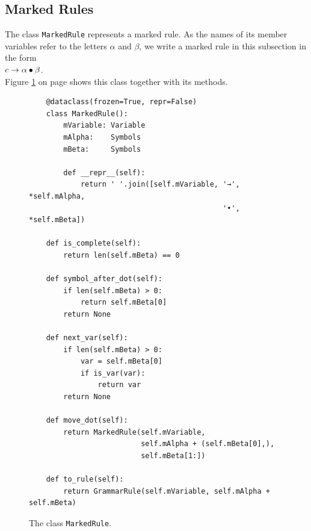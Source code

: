 \subsection{Marked Rules}
The class \texttt{MarkedRule} represents a marked rule.  As the names of its member variables refer to the letters
$\alpha$ and $\beta$, we write a marked rule in this subsection in the form
\\[0.2cm]
\hspace*{1.3cm}
$c \rightarrow \alpha \mdot \beta$.
\\[0.2cm]
Figure \ref{fig:04-SLR-Table-Generator.ipynb:MarkedRule} on page \pageref{fig:04-SLR-Table-Generator.ipynb:MarkedRule}
shows this class together with its methods.

\begin{figure}[!ht]
\centering
\begin{verbatim}
    @dataclass(frozen=True, repr=False)
    class MarkedRule():
        mVariable: Variable
        mAlpha:    Symbols
        mBeta:     Symbols

        def __repr__(self):
            return ' '.join([self.mVariable, '→', *self.mAlpha,
                                             '•', *self.mBeta])

    def is_complete(self):
        return len(self.mBeta) == 0

    def symbol_after_dot(self):
        if len(self.mBeta) > 0:
            return self.mBeta[0]
        return None

    def next_var(self):
        if len(self.mBeta) > 0:
            var = self.mBeta[0]
            if is_var(var):
                return var
        return None

    def move_dot(self):
        return MarkedRule(self.mVariable,
                          self.mAlpha + (self.mBeta[0],),
                          self.mBeta[1:])

    def to_rule(self):
        return GrammarRule(self.mVariable, self.mAlpha + self.mBeta)
\end{verbatim}
\vspace*{-0.3cm}
\caption{The class \texttt{MarkedRule}.}
\label{fig:04-SLR-Table-Generator.ipynb:MarkedRule}
\end{figure}

